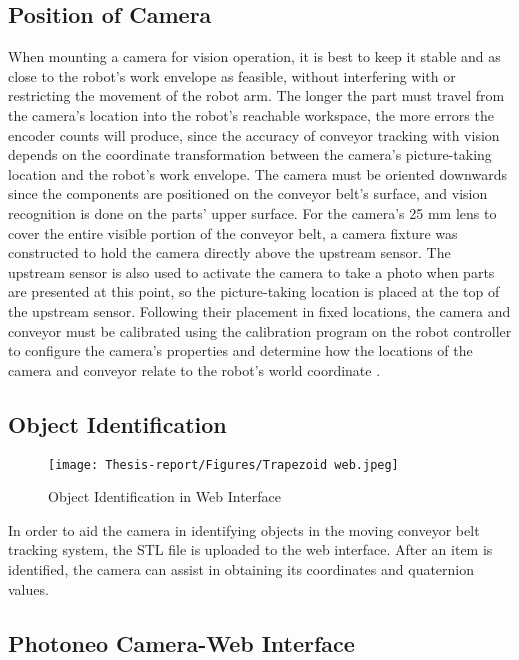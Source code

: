 \documentclass[12pt]{article}
\begin{document}
\subsection{Position of Camera}
When mounting a camera for vision operation, it is best to keep it stable and as close to the robot's work envelope as feasible, without interfering with or restricting the movement of the robot arm. The longer the part must travel from the camera's location into the robot's reachable workspace, the more errors the encoder counts will produce, since the accuracy of conveyor tracking with vision depends on the coordinate transformation between the camera's picture-taking location and the robot's work envelope. The camera must be oriented downwards since the components are positioned on the conveyor belt's surface, and vision recognition is done on the parts' upper surface. For the camera's 25 mm lens to cover the entire visible portion of the conveyor belt, a camera fixture was constructed to hold the camera directly above the upstream sensor. The upstream sensor is also used to activate the camera to take a photo when parts are presented at this point, so the picture-taking location is placed at the top of the upstream sensor. Following their placement in fixed locations, the camera and conveyor must be calibrated using the calibration program on the robot controller to configure the camera's properties and determine how the locations of the camera and conveyor relate to the robot's world coordinate \cite{ref19}.\

\subsection{Object Identification}
\begin{figure}[h]
    \centering
    \texttt{[image: Thesis-report/Figures/Trapezoid web.jpeg]}
    \caption{Object Identification in Web Interface}
    \label{fig:web_interface}
\end{figure}


In order to aid the camera in identifying objects in the moving conveyor belt tracking system, the STL file is uploaded to the web interface.  After an item is identified, the camera can assist in obtaining its coordinates and quaternion values.

\subsection{Photoneo Camera-Web Interface}
\end{document}
